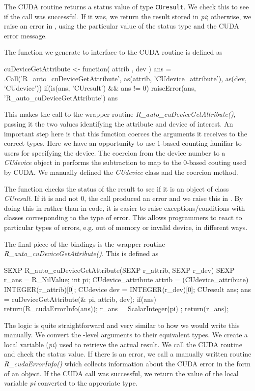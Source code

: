 \documentclass[article]{jss}
\def\C{\proglang{C}}
\def\R{\proglang{R}}
\def\Cfunc#1{\textit{#1()}}
\def\Cvar#1{\textit{#1}}
\def\Ctype#1{\texttt{#1}}
\def\Rclass#1{\textit{#1}}
\begin{document}
The CUDA routine returns a status value of type \Ctype{CUresult}.  We
check this to see if the call was successful. If it was, we return the
result stored in \Cvar{pi}; otherwise, we raise an error in \R, using
the particular value of the status type and the CUDA error message.

The \R{} function we generate to interface to the CUDA routine is
defined as
\begin{RCode}
cuDeviceGetAttribute <-
function( attrib , dev  )
{
   ans = .Call('R_auto_cuDeviceGetAttribute', 
                   as(attrib, 'CUdevice_attribute'), 
                   as(dev, 'CUdevice'))
   if(is(ans, 'CUresult') && ans != 0)
       raiseError(ans, 'R_auto_cuDeviceGetAttribute')
   ans
}
\end{RCode}
This makes the call to the wrapper routine
\Cfunc{R\_auto\_cuDeviceGetAttribute}, passing it the two \R{} values
identifying the attribute and device of interest.  An important step
here is that this \R{} function coerces the arguments it receives to
the correct types.  Here we have an opportunity to use $1$-based
counting familiar to \R{} users for specifying the device.  The
coercion from the device number to a \Rclass{CUdevice} object in \R{}
performs the subtraction to map to the $0$-based couting used by CUDA.
We manually defined the \Rclass{CUdevice} class and the coercion method.

The function checks the status of the result to see if it is an \R{}
object of class \Rclass{CUresult}. If it is and not $0$, the call
produced an error and we raise this in \R. By doing this in \R{}
rather than in \C{} code, it is easier to raise exceptions/conditions
with classes corresponding to the type of error. This allows
programmers to react to particular types of errors, e.g. out of memory
or invalid device, in different ways.

The final piece of the bindings is the \C{} wrapper routine
\Cfunc{R\_auto\_cuDeviceGetAttribute}. This is defined as 
\begin{CCode}
SEXP
R_auto_cuDeviceGetAttribute(SEXP r_attrib, SEXP r_dev)
{
    SEXP r_ans = R_NilValue;
    int pi;
    CUdevice_attribute attrib = (CUdevice_attribute) INTEGER(r_attrib)[0];
    CUdevice dev = INTEGER(r_dev)[0];
    CUresult ans;
    ans = cuDeviceGetAttribute(& pi,  attrib,  dev);
    if(ans)
       return(R_cudaErrorInfo(ans));
    r_ans = ScalarInteger(pi) ;
    return(r_ans);
}
\end{CCode}
The logic is quite straightforward and very similar to how we would
write this manually. We convert the \R-level arguments to their
equivalent \C{} types.  We create a local variable (\Cvar{pi}) used to
retrieve the actual result.  We call the CUDA routine and check the
status value.  If there is an error, we call a manually written
routine \Cfunc{R\_cudaErrorInfo} which collects information about the
CUDA error in the form of an \R{} object.  If the CUDA call was
successful, we return the value of the local variable \Cvar{pi}
converted to the approriate \R{} type.
\end{document}

